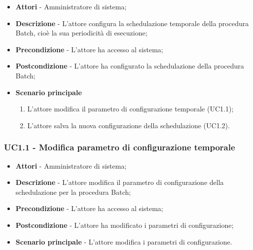             \begin{itemize}

                \item \textbf{Attori} - Amministratore di sistema;
                \item \textbf{Descrizione} - L'attore configura la schedulazione temporale della procedura Batch, cioè la
                sua periodicità di esecuzione;
                \item \textbf{Precondizione} - L'attore ha accesso al sistema;
                \item \textbf{Postcondizione} - L'attore ha configurato la schedulazione della procedura Batch;
                \item \textbf{Scenario principale}

                    \begin{enumerate}

                        \item L'attore modifica il parametro di configurazione temporale (UC1.1);
                        \item L'attore salva la nuova configurazione della schedulazione (UC1.2).

                    \end{enumerate}

            \end{itemize}

            \subsubsection{UC1.1 - Modifica parametro di configurazione temporale}

                \begin{itemize}

                    \item \textbf{Attori} - Amministratore di sistema;
                    \item \textbf{Descrizione} - L'attore modifica il parametro di configurazione della schedulazione per la
                    procedura Batch;
                    \item \textbf{Precondizione} - L'attore ha accesso al sistema;
                    \item \textbf{Postcondizione} - L'attore ha modificato i parametri di configurazione;
                    \item \textbf{Scenario principale} - L'attore modifica i parametri di configurazione.

                \end{itemize}

